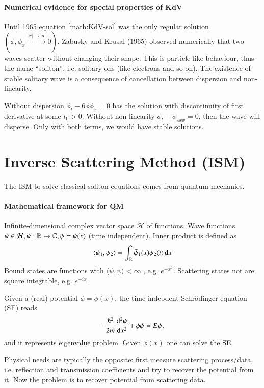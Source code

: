 \paragraph{Numerical evidence for special properties of KdV}
Until 1965 equation \eqref{math:KdV-sol} was the only regular solution $(\phi, \phi_x \stackrel{|x| \rightarrow \infty}{\rightarrow} 0)$. Zabusky and Krusal (1965) observed numerically that two waves scatter without changing their shape. This is particle-like behaviour, thus the name ``soliton'', i.e. solitary-ons (like electrons and so on). The existence of stable solitary wave is a consequence of cancellation between dispersion and non-linearity.

Without dispersion $\phi_t - 6 \phi \phi_x = 0$ has the solution with discontinuity of first derivative at some $t_0 > 0$. Without non-linearity $\phi_t + \phi_{x x x} = 0$, then the wave will disperse. Only with both terms, we would have stable solutions.

\section{Inverse Scattering Method (ISM)}
The ISM to solve classical soliton equations comes from quantum mechanics.

\paragraph{Mathematical framework for QM}
Infinite-dimensional complex vector space $\mathcal{H}$ of functions. Wave functions $\psi \in \mathcal{H}, \psi: \mathbb{R} \rightarrow \mathbb{C}, \psi = \psi(x)$ (time independent). Inner product is defined as 
\begin{equation}
	\langle \psi_1, \psi_2 \rangle = \int_{\mathbb{R}} \bar{\psi}_1 (x) \psi_2(t) \dd{x}
	\label{math:2.1}
\end{equation}
Bound states are functions with $\langle \psi, \psi \rangle < \infty$ , e.g. $e^{-x^2}$.  Scattering states not are square integrable, e.g. $e^{-ix}$.

Given a (real) potential $\phi = \phi(x)$, the time-indepdent Schrödinger equation (SE) reads 
\begin{equation*}
	- \frac{\hbar^2}{2m} \dv[2]{\psi}{x} + \phi \psi = E \psi,
\end{equation*}
and it represents eigenvalue problem. Given $\phi(x)$ one can solve the SE.

Physical needs are typically the opposite: first measure scattering process/data, i.e. reflection and transmission coefficients and try to recover the potential from it. Now the problem is to recover potential from scattering data.

